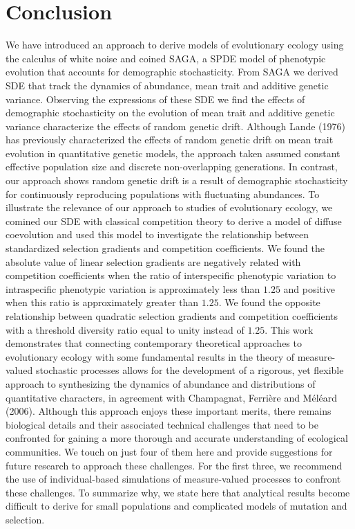 \documentclass[]{elsarticle} %
\begin{document}
\hypertarget{conclusion}{%
\section{\texorpdfstring{Conclusion
\label{conclusion}}{Conclusion }}\label{conclusion}}

We have introduced an approach to derive models of evolutionary ecology
using the calculus of white noise and coined SAGA, a SPDE model of
phenotypic evolution that accounts for demographic stochasticity. From
SAGA we derived SDE that track the dynamics of abundance, mean trait and
additive genetic variance. Observing the expressions of these SDE we
find the effects of demographic stochasticity on the evolution of mean
trait and additive genetic variance characterize the effects of random
genetic drift. Although Lande (1976) has previously characterized the
effects of random genetic drift on mean trait evolution in quantitative
genetic models, the approach taken assumed constant effective population
size and discrete non-overlapping generations. In contrast, our approach
shows random genetic drift is a result of demographic stochasticity for
continuously reproducing populations with fluctuating abundances. To
illustrate the relevance of our approach to studies of evolutionary
ecology, we comined our SDE with classical competition theory to derive
a model of diffuse coevolution and used this model to investigate the
relationship between standardized selection gradients and competition
coefficients. We found the absolute value of linear selection gradients
are negatively related with competition coefficients when the ratio of
interspecific phenotypic variation to intraspecific phenotypic variation
is approximately less than \(1.25\) and positive when this ratio is
approximately greater than \(1.25\). We found the opposite relationship
between quadratic selection gradients and competition coefficients with
a threshold diversity ratio equal to unity instead of \(1.25\). This
work demonstrates that connecting contemporary theoretical approaches to
evolutionary ecology with some fundamental results in the theory of
measure-valued stochastic processes allows for the development of a
rigorous, yet flexible approach to synthesizing the dynamics of
abundance and distributions of quantitative characters, in agreement
with Champagnat, Ferrière and Méléard (2006). Although this approach
enjoys these important merits, there remains biological details and
their associated technical challenges that need to be confronted for
gaining a more thorough and accurate understanding of ecological
communities. We touch on just four of them here and provide suggestions
for future research to approach these challenges. For the first three,
we recommend the use of individual-based simulations of measure-valued
processes to confront these challenges. To summarize why, we state here
that analytical results become difficult to derive for small populations
and complicated models of mutation and selection.
\end{document}
